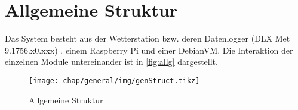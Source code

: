 \chapter{Allgemeine Struktur}
Das System besteht aus der Wetterstation bzw. deren Datenlogger (DLX Met 9.1756.x0.xxx) , einem Raspberry Pi und einer DebianVM. Die Interaktion der einzelnen Module untereinander ist in \autoref{fig:allg} dargestellt.  
\begin{center}
\begin{figure}[H]
	\centering
	\texttt{[image: chap/general/img/genStruct.tikz]}
	\caption{Allgemeine Struktur}
	\label{fig:allg}
\end{figure}
\end{center}


